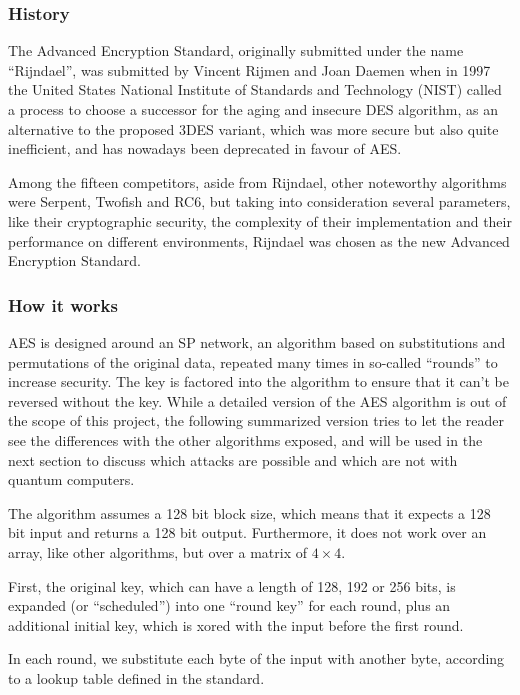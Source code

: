 \subsubsection{History}

The Advanced Encryption Standard, originally submitted under the name
“Rijndael”, was submitted by Vincent Rijmen and Joan Daemen when in  1997 the
United States National Institute of Standards and Technology (NIST) called a
process to choose a successor for the aging and insecure DES algorithm, as an
alternative to the proposed 3DES variant, which was more secure but also quite
inefficient, and has nowadays been deprecated in favour of AES.

Among the fifteen competitors, aside from Rijndael, other noteworthy algorithms
were Serpent, Twofish and RC6, but taking into consideration several parameters,
like their cryptographic security, the complexity of their implementation and
their performance on different environments, Rijndael was chosen as the new
Advanced Encryption Standard.

\subsubsection{How it works}

AES is designed around an SP network, an algorithm based on substitutions and
permutations of the original data, repeated many times in so-called “rounds” to
increase security. The key is factored into the algorithm to ensure that it
can't be reversed without the key. While a detailed version of the AES algorithm
is out of the scope of this project, the following summarized version tries to
let the reader see the differences with the other algorithms exposed, and will
be used in the next section to discuss which attacks are possible and which are
not with quantum computers.

The algorithm assumes a 128 bit block size, which means that it expects a 128
bit input and returns a 128 bit output. Furthermore, it does not work over an
array, like other algorithms, but over a matrix of $4 \times 4$.

First, the original key, which can have a length of 128, 192 or 256 bits, is
expanded (or “scheduled”) into one “round key” for each round, plus an
additional initial key, which is xored with the input before the first round.

In each round, we substitute each byte of the input with another byte, according
to a lookup table defined in the standard.

